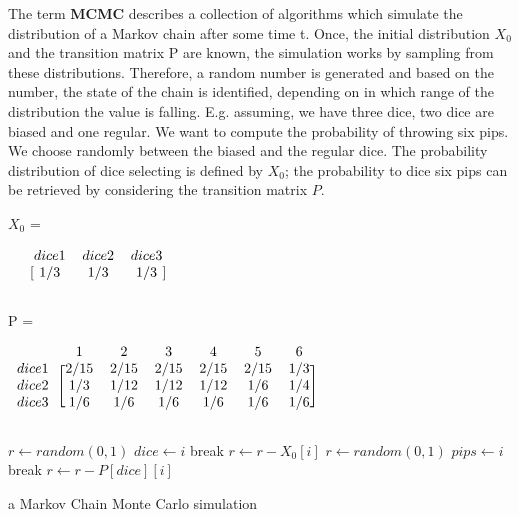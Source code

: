 The term \textbf{\ac{MCMC}} describes a collection of algorithms which simulate the distribution of a Markov chain after some time t. Once, the initial distribution $X_0$ and the transition matrix P are known, the simulation works by sampling from these distributions. Therefore, a random number is generated and based on the number, the state of the chain is identified, depending on in which range of the distribution the value is falling.\newline
E.g. assuming, we have three dice, two dice are biased and one regular. We want to compute the probability of throwing six pips. We choose randomly between the biased and the regular dice. The probability distribution of dice selecting is defined by $X_0$; the probability to dice six pips can be retrieved by considering the transition matrix $P$.
\begin{center}
\begin{large}
$X_0$ =
\end{large}
$\begin{blockarray}{cccc}
  & dice 1 & dice 2 & dice 3 \\
  \begin{block}{c[ccc]}
    & 1/3 & 1/3 & 1/3 \\
  \end{block}
\end{blockarray}$
\\
\begin{LARGE}
P =
\end{LARGE}
$\begin{blockarray}{ccccccc}
  & 1 & 2 & 3 & 4 & 5 & 6 \\
  \begin{block}{c[cccccc]}
    dice 1 & 2/15 & 2/15 & 2/15 & 2/15 & 2/15 & 1/3 \\
    dice 2 & 1/3 & 1/12 & 1/12 & 1/12 & 1/6 & 1/4 \\
    dice 3 & 1/6 & 1/6 & 1/6 & 1/6 & 1/6 & 1/6 \\
  \end{block}
\end{blockarray}$
\end{center}

\begin{algorithm}
\begin{algorithmic}
\State $r \gets random(0,1)$
\State $dice \gets i$
\State break
\Else
\State $r \gets r - X_0[i]$
\EndIf
\EndFor
\State $r \gets random(0,1)$
\State $pips \gets i$
\State break
\Else
\State $r \gets r - P[dice][i]$
\EndIf
\EndFor
\end{algorithmic}
\caption{\label{MCMC} a Markov Chain Monte Carlo simulation}
\end{algorithm}

